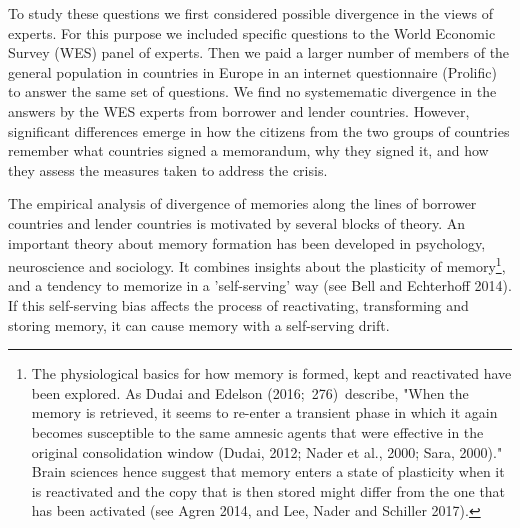 \documentclass[12pt]{article}
\begin{document}
To study these questions we first considered possible divergence in the
views of experts. For this purpose we included specific questions
to the World Economic Survey (WES) panel of experts. Then we paid a larger
number of members of the general population in countries in Europe in an
internet questionnaire (Prolific) to answer the same set of questions. We
find no systemematic divergence in the answers by the WES experts from borrower and lender countries. However, significant differences emerge in how
the citizens from the two groups of countries remember what countries signed
a memorandum, why they signed it, and how they assess the measures taken to
address the crisis.  

The empirical analysis of divergence of memories along the lines of borrower
countries and lender countries is motivated by several blocks of
theory. An important theory about memory formation has been developed in
psychology, neuroscience and sociology. It combines insights about the
plasticity of memory\footnote{%
The physiological basics for how memory is formed, kept and reactivated have
been explored. As Dudai and Edelson (2016;\ 276)\ describe, "When the memory
is retrieved, it seems to re-enter a transient phase in which it again
becomes susceptible to the same amnesic agents that were effective in the
original consolidation window (Dudai, 2012; Nader et al., 2000; Sara,
2000)." Brain sciences hence suggest that memory enters a state of
plasticity when it is reactivated and the copy that is then stored might
differ from the one that has been activated (see Agren 2014, and Lee, Nader
and Schiller 2017).}, and a tendency to memorize in a 'self-serving' way
(see Bell and Echterhoff 2014). If this self-serving bias affects the
process of reactivating, transforming and storing memory, it can cause
memory with a self-serving drift.
\end{document}
